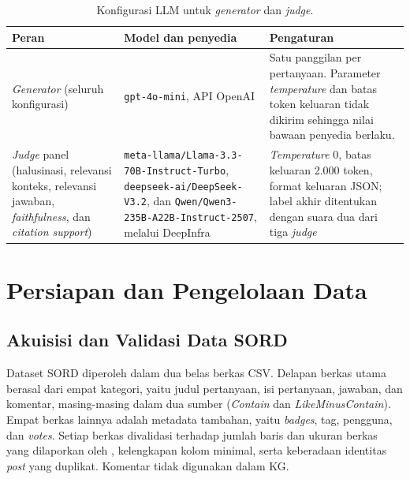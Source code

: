 \begin{table}[!htbp]
\centering
\small
\caption{Konfigurasi LLM untuk \emph{generator} dan \emph{judge}.}
\label{tab:konfigurasi-llm}
\renewcommand{\arraystretch}{1.2}
\begin{tabularx}{\textwidth}{|>{\raggedright\arraybackslash}p{2.8cm}|>{\raggedright\arraybackslash}p{4.6cm}|>{\raggedright\arraybackslash}X|}
\hline
\textbf{Peran} & \textbf{Model dan penyedia} & \textbf{Pengaturan} \\
\hline
\emph{Generator} (seluruh konfigurasi) & \texttt{gpt-4o-mini}, API OpenAI & Satu panggilan per pertanyaan. Parameter \emph{temperature} dan batas token keluaran tidak dikirim sehingga nilai bawaan penyedia berlaku. \\
\hline
\emph{Judge} panel (halusinasi, relevansi konteks, relevansi jawaban, \emph{faithfulness}, dan \emph{citation support}) & \texttt{meta-llama/Llama-3.3-70B-Instruct-Turbo}, \texttt{deepseek-ai/DeepSeek-V3.2}, dan \texttt{Qwen/Qwen3-235B-A22B-Instruct-2507}, melalui DeepInfra & \emph{Temperature} 0, batas keluaran 2.000 token, format keluaran JSON; label akhir ditentukan dengan suara dua dari tiga \emph{judge} \\
\hline
\end{tabularx}
\end{table}

\section{Persiapan dan Pengelolaan Data}
\label{sec:persiapan-data}

\subsection{Akuisisi dan Validasi Data SORD}
\label{subsec:akuisisi-dan-validasi-data}

Dataset SORD \autocite{Fatima2026} diperoleh dalam dua belas berkas CSV. Delapan berkas utama berasal dari empat kategori, yaitu judul pertanyaan, isi pertanyaan, jawaban, dan komentar, masing-masing dalam dua sumber (\emph{Contain} dan \emph{LikeMinusContain}). Empat berkas lainnya adalah metadata tambahan, yaitu \emph{badges}, tag, pengguna, dan \emph{votes}. Setiap berkas divalidasi terhadap jumlah baris dan ukuran berkas yang dilaporkan oleh \textcite{Fatima2026}, kelengkapan kolom minimal, serta keberadaan identitas \emph{post} yang duplikat. Komentar tidak digunakan dalam KG.

